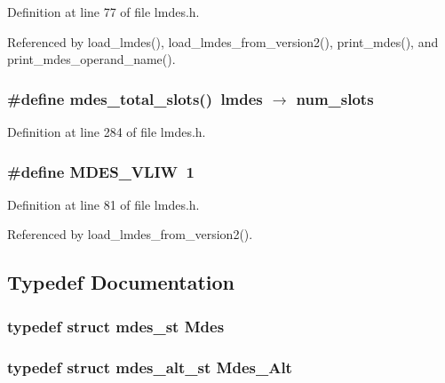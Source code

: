 Definition at line 77 of file lmdes.h.

Referenced by load\_\-lmdes(), load\_\-lmdes\_\-from\_\-version2(), print\_\-mdes(), and print\_\-mdes\_\-operand\_\-name().
\subsubsection{\setlength{\rightskip}{0pt plus 5cm}\#define mdes\_\-total\_\-slots()~\bf{lmdes} $\rightarrow$ num\_\-slots}\label{lmdes_8h_a3177b0b40f3125b0ce34d7938e2dbbd}




Definition at line 284 of file lmdes.h.
\subsubsection{\setlength{\rightskip}{0pt plus 5cm}\#define MDES\_\-VLIW~1}\label{lmdes_8h_1dd3b99b38350ea5ad6a1ae70624f7a4}




Definition at line 81 of file lmdes.h.

Referenced by load\_\-lmdes\_\-from\_\-version2().

\subsection{Typedef Documentation}
\subsubsection{\setlength{\rightskip}{0pt plus 5cm}typedef struct \bf{mdes\_\-st}
 \bf{Mdes}}\label{lmdes_8h_81d40116ad293c4a88ed3f5ebde9a6c5}


\subsubsection{\setlength{\rightskip}{0pt plus 5cm}typedef struct \bf{mdes\_\-alt\_\-st}
 \bf{Mdes\_\-Alt}}\label{lmdes_8h_4589dad1c6599eb0f74abbeda089e76c}


